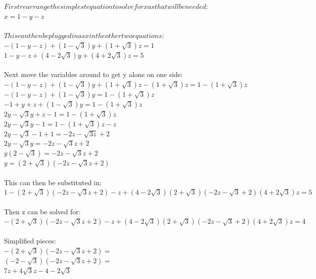 \documentclass{article}
\begin{document}
\begin{solution}
\\\\ $First rearrange the simplest equation to solve for x as that will be needed: $
\\ $x = 1 - y - z$
\newline
\\\\ $This can then be plugged in as x in the other two equations: $
\\ $-(1-y-z)+(1-\sqrt{3})y+(1+\sqrt{3})z = 1$
\\ $1-y-z+(4-2\sqrt{3})y+(4+2\sqrt{3})z = 5$
\newline
\\\\ Next move the variables around to get y alone on one side: 
\\ $-(1-y-z)+(1-\sqrt{3})y+(1+\sqrt{3})z -(1+\sqrt{3})z = 1 - (1+\sqrt{3})z$
\\ $-(1-y-z) + (1-\sqrt{3})y = 1 - (1+\sqrt{3})z$
\\ $-1+y+z + (1-\sqrt{3})y = 1 - (1+\sqrt{3})z$
\\ $2y - \sqrt{3}y + z - 1 = 1 - (1+\sqrt{3})z$
\\ $2y - \sqrt{3}y -1 = 1 - (1+\sqrt{3})z - z$
\\ $2y - \sqrt{3} -1 +1 = -2z-\sqrt{3z}+2$
\\ $2y -\sqrt{3}y = -2z-\sqrt{3}z+2$
\\ $y(2-\sqrt{3}) = -2z-\sqrt{3}z+2$
\\ $y = (2+\sqrt{3})(-2z-\sqrt{3}z+2)$
\newline
\\\\ This can then be substituted in:
\\ $1-(2+\sqrt{3})(-2z-\sqrt{3}z+2)-z+(4-2\sqrt{3})(2+\sqrt{3})(-2z-\sqrt{3}+2)(4+2\sqrt{3})z = 5$
\newline
\\\\ Then z can be solved for:
\\ $-(2+\sqrt{3})(-2z-\sqrt{3}z+2)-z+(4-2\sqrt{3})(2+\sqrt{3})(-2z-\sqrt{3}+2)(4+2\sqrt{3})z = 4$
\newline
\\\\ Simplified pieces:
\\ $-(2+\sqrt{3})(-2z-\sqrt{3}z+2) = $
\\ $(-2-\sqrt{3})(-2z-\sqrt{3}z+2) = $
\\ $7z+4\sqrt{3}z-4-2\sqrt{3}$
\newline

\end{solution}
\end{document}
